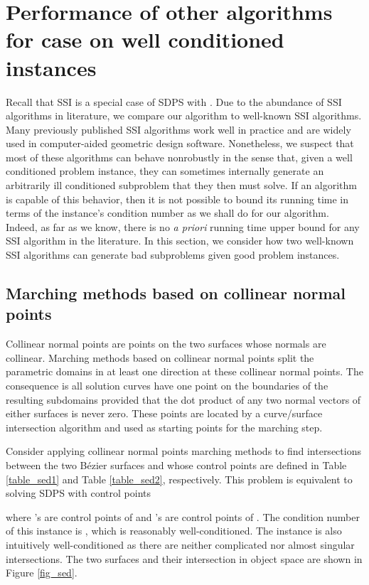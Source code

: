 \documentclass{article}
\begin{document}
\section{Performance of other algorithms for  case on well conditioned instances}
\label{section_other}

Recall that SSI is a special case of SDPS with .  Due to the 
abundance of SSI algorithms in literature, we compare our algorithm to well-known SSI algorithms.  Many previously published SSI algorithms work
well in practice and are widely used in computer-aided geometric design software.  Nonetheless, we
suspect that most of these algorithms can behave nonrobustly in the sense
that, given a well conditioned problem instance, they can sometimes internally
generate an arbitrarily ill conditioned subproblem that they then
must solve.  If an algorithm
is capable of this behavior, then it is not possible to bound
its running time in terms of the instance's condition number as we shall do
for our algorithm.
Indeed, as far as we know, there is no \emph{a priori} running time upper bound for any SSI algorithm in the literature.
In this section, we consider how two well-known SSI
algorithms can generate bad subproblems given good problem instances.


\subsection{Marching methods based on collinear normal points}
\label{section_sederberg}
Collinear normal points are points on the two surfaces whose normals
are collinear.  Marching methods based on collinear normal points
split the parametric domains in at least one direction at these
collinear normal points.  The consequence is all solution curves
have one point on the boundaries of the resulting subdomains provided
that the dot product of any two normal vectors of either surfaces is
never zero.  These points are located by a curve/surface intersection
algorithm and used as starting points for the marching step.

Consider applying collinear normal points marching methods to find
intersections between the two B\'{e}zier surfaces  and  whose
control points are defined in Table \ref{table_sed1} and Table
\ref{table_sed2}, respectively.  This problem is equivalent to solving SDPS with control points

where 's  are control points of  and 's  are control points of .
The condition number of this instance
is , which is reasonably well-conditioned.  The instance
is also intuitively well-conditioned as there are neither complicated
nor almost singular intersections.  The two surfaces and their
intersection in object space are shown in Figure \ref{fig_sed}.
\end{document}
